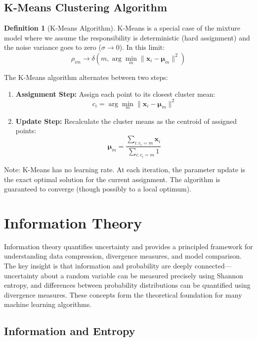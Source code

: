 \documentclass[12pt,a4paper]{article}
\theoremstyle{definition}
\newtheorem{definition}{Definition}[section]
\begin{document}
\newpage


\subsection{K-Means Clustering Algorithm}

\begin{definition}[K-Means Algorithm]
K-Means is a special case of the mixture model where we assume the responsibility is deterministic (hard assignment) and the noise variance goes to zero ($\sigma \to 0$). In this limit:
\[
\rho_{im} \to \delta(m, \arg\min_m \|\mathbf{x}_i - \boldsymbol{\mu}_m\|^2)
\]

The K-Means algorithm alternates between two steps:

\begin{enumerate}
    \item \textbf{Assignment Step:} Assign each point to its closest cluster mean:
    \[
    c_i = \arg\min_m \|\mathbf{x}_i - \boldsymbol{\mu}_m\|^2
    \]
    
    \item \textbf{Update Step:} Recalculate the cluster means as the centroid of assigned points:
    \[
    \boldsymbol{\mu}_m = \frac{\sum_{i: c_i = m} \mathbf{x}_i}{\sum_{i: c_i = m} 1}
    \]
\end{enumerate}

Note: K-Means has no learning rate. At each iteration, the parameter update is the exact optimal solution for the current assignment. The algorithm is guaranteed to converge (though possibly to a local optimum).
\end{definition}

\section{Information Theory}

Information theory quantifies uncertainty and provides a principled framework for understanding data compression, divergence measures, and model comparison. The key insight is that information and probability are deeply connected—uncertainty about a random variable can be measured precisely using Shannon entropy, and differences between probability distributions can be quantified using divergence measures. These concepts form the theoretical foundation for many machine learning algorithms.

\subsection{Information and Entropy}
\end{document}
